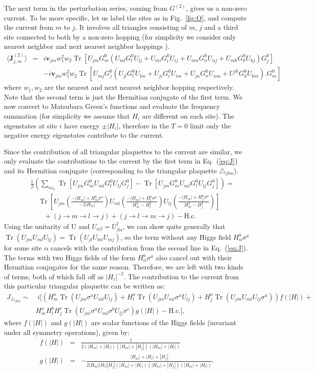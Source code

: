 \documentclass[aps,prb,preprint,onecolumn,citeautoscript,superscriptaddress,footinbib,
eqsecnum]{revtex4-1}
\def\bea{\begin{eqnarray}}
\def\eea{\end{eqnarray}}
\def \on{{\omega_n}}
\def \sa{{\sigma^a}}
\DeclareMathOperator{\Tr}{Tr}
\newcommand{\nn}{\nonumber \\}
\begin{document}
The next term in the perturbation series, coming from $G^{(2)}$, gives us a non-zero current. To be more specific, let us label the sites as in Fig.~\ref{fig:O}, and compute the current from $m$ to $j$. It involves all triangles consisting of $m$, $j$ and a third site connected to both by a non-zero hopping (for simplicity we consider only nearest neighbor and next nearest neighbor hoppings ).
\bea
\label{eq:J}
\langle \bm{J}^{(2)}_{j,m}  \rangle &=& i \bm{v}_{jm} w_{1}^2 w_2 \Tr \left[ U_{jm} G^0_{m} \left( U_{ml} G^0_l U_{lj}  +  U_{mi} G^0_i U_{ij}  + U_{mn} G^0_n U_{nj} + U_{mk} G^0_k U_{kj} \right) G^0_j \right] \nn
& & -  i \bm{v}_{jm} w_{1}^2 w_2 \Tr \left[ U_{mj} G^0_j \left( U_{jl} G^0_l U_{lm} + U_{ji} G^0_i U_{im} + U_{jn} G^0_n U_{nm}+ U^{jk} G^0_k U_{km} \right ). G^0_{m}\right]
\eea
where $w_1, w_2$ are the nearest and next nearest neighbor hopping respectively. Note that the second term is just the Hermitian conjugate of the first term. We now convert to Matsubara Green's functions and evaluate the frequency summation (for simplicity we assume that $H_i$ are different on each site). The eigenstates at site $i$ have energy $\pm |H_i|$, therefore in the $T = 0$ limit only the negative energy eigenstates contribute to the current. 

Since the contribution of all triangular plaquettes to the current are similar, we only evaluate the contributions to the current by the first term in Eq.~(\ref{eq:J}) and its Hermitian conjugate (corresponding to the triangular plaquette $\triangle_{jlm}$). 
\bea
&& \frac{1}{\beta}\left( \sum_{i \on}  \Tr \left[ U_{jm} G^0_{m} U_{ml} G^0_l U_{lj} G^0_{j} \right] - \Tr \left[U_{jm} G^0_{m} U_{ml} G^0_l U_{lj}  G^0_j \right] \right) = \nn  
&&~~~~~\Tr \left[ U_{jm} \left( \frac{-|H_m| + H^a_m \sa}{-2 |H_m|} \right) U_{ml} \left( \frac{-|H_m| + H^a_l \sa}{H_m^2 - H_l^2} \right) U_{lj}  \left( \frac{-|H_m| + H^a_j \sa}{H_m^2 - H_j^2} \right) \right] \nn
&&~~~~~~~~~ + (j \rightarrow m \rightarrow l \rightarrow j) + (j \rightarrow l \rightarrow m \rightarrow j) - \mbox{H.c.}
\eea
Using the unitarity of U and $U_{\alpha \beta} = U^{\dagger}_{\beta \alpha}$, we can show quite generally that $\Tr(U_{jm} U_{ml} U_{lj}) = \Tr(U_{jl} U_{lm} U_{mj})$, so the term without any Higgs field $H_{\alpha}^a \sigma^a$ for some site $\alpha$ cancels with the contribution from the second line in Eq.~(\ref{eq:J}). The terms with two Higgs fields of the form $H_{\alpha}^a \sigma^a$ also cancel out with their Hermitian conjugates for the same reason. Therefore, we are left with two kinds of terms, both of which fall off as $|H_i|^{-2}$. The contribution to the current from this particular triangular plaquette can be written as:
\bea
J_{\triangle_{jlm}}  \sim & \; i \biggl[ \left( H^a_m \Tr(U_{jm}  \sa U_{ml} U_{lj}) + H^a_l  \Tr(U_{jm} U_{ml} \sa U_{lj})  + H^a_j  \Tr(U_{jm} U_{ml} U_{lj} \sa) \right) f(|H|) + \nn
 & H_m^a H_l^b H_j^c\Tr(U_{jm}\sa U_{ml} \sigma^b U_{lj} \sigma^c) g(|H|) -  \mbox{H.c.} \biggr],
\eea
where $f(|H|)$ and $g(|H|)$ are scalar functions of the Higgs fields (invariant under all symmetry operations), given by:
\bea
 f(|H|) &=&  \frac{1}{2(|H_m| + |H_l| )(|H_m| + |H_j|)(|H_m| + |H_l|)} \nn
 g(|H|) &=& -\frac{|H_m| + |H_{l}| + |H_{j}|}{2 |H_m| |H_l| |H_j| (|H_m| + |H_l| )(|H_m| + |H_j|)(|H_m| + |H_l|)}. 
\eea
\end{document}
